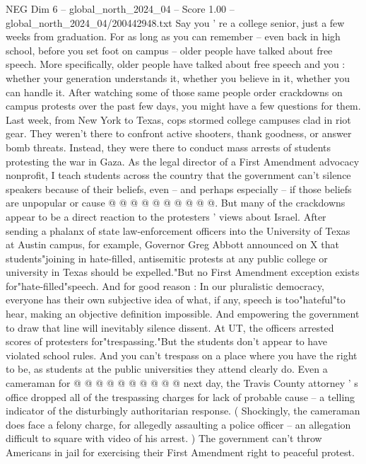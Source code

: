\begin{textsample}{NEG Dim 6 – global\_north\_2024\_04 – Score 1.00 – global\_north\_2024\_04/200442948.txt}  \label{ex:f6_neg_346}
Say you ' re a college senior, just a few weeks from graduation.
For as long as you can remember -- even back in high school, before you set foot on campus -- older people have talked about free speech.
More specifically, older people have talked about free speech and you : whether your generation understands it, whether you believe in it, whether you can handle it.
After watching some of those same people order crackdowns on campus protests over the past few days, you might have a few questions for them.
Last week, from New York to Texas, cops stormed college campuses clad in riot gear.
They weren't there to confront active shooters, thank goodness, or answer bomb threats.
Instead, they were there to conduct mass arrests of students protesting the war in Gaza.
As the legal director of a First Amendment advocacy nonprofit, I teach students across the country that the government can't silence speakers because of their beliefs, even -- and perhaps especially -- if those beliefs are unpopular or cause @ @ @ @ @ @ @ @ @ @.
But many of the crackdowns appear to be a direct reaction to the protesters ' views about Israel.
After sending a phalanx of state law-enforcement officers into the University of Texas at Austin campus, for example, Governor Greg Abbott announced on X that students"joining in hate-filled, antisemitic protests at any public college or university in Texas should be expelled."But no First Amendment exception exists for"hate-filled"speech.
And for good reason : In our pluralistic democracy, everyone has their own subjective idea of what, if any, speech is too"hateful"to hear, making an objective definition impossible.
And empowering the government to draw that line will inevitably silence dissent.
At UT, the officers arrested scores of protesters for"trespassing."But the students don't appear to have violated school rules.
And you can't trespass on a place where you have the right to be, as students at the public universities they attend clearly do.
Even a cameraman for @ @ @ @ @ @ @ @ @ @ next day, the Travis County attorney ' s office dropped all of the trespassing charges for lack of probable cause -- a telling indicator of the disturbingly authoritarian response. ( Shockingly, the cameraman does face a felony charge, for allegedly assaulting a police officer -- an allegation difficult to square with video of his arrest. ) The government can't throw Americans in jail for exercising their First Amendment right to peaceful protest.

\end{textsample}
